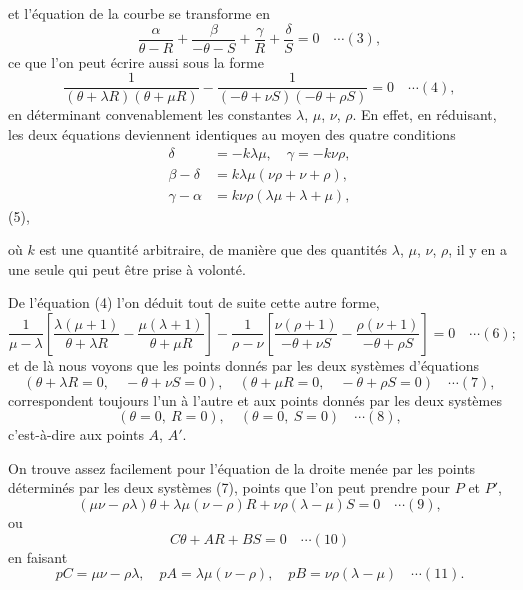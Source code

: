 \documentclass[12pt,a4paper]{article}
\begin{document}
et l'\'equation de la courbe se transforme en
\[
\frac{\alpha}{\theta - R} + \frac{\beta}{-\theta - S} + \frac{\gamma}{R} + \frac{\delta}{S} = 0 \quad\cdots(3),
\]
ce que l'on peut \'ecrire aussi sous la forme
\[
\frac{1}{(\theta + \lambda R)(\theta + \mu R)} - \frac{1}{(-\theta + \nu S)(-\theta + \rho S)} = 0 \quad\cdots(4),
\]
en d\'eterminant convenablement les constantes $\lambda$, $\mu$, $\nu$, $\rho$. En effet, en r\'eduisant, les deux \'equations deviennent identiques au moyen des quatre conditions
\begin{align*}
\delta &= -k\lambda\mu,\quad \gamma = -k\nu\rho,\\
\beta - \delta &= k\lambda\mu(\nu\rho + \nu + \rho),\\
\gamma - \alpha &= k\nu\rho(\lambda\mu + \lambda + \mu),
\end{align*}
\hfill (5),

\noindent o\`u $k$ est une quantit\'e arbitraire, de mani\`ere que des quantit\'es $\lambda$, $\mu$, $\nu$, $\rho$, il y en a une seule qui peut \^etre prise \`a volont\'e.

De l'\'equation (4) l'on d\'eduit tout de suite cette autre forme,
\[
\frac{1}{\mu - \lambda}\left[\frac{\lambda(\mu + 1)}{\theta + \lambda R} - \frac{\mu(\lambda + 1)}{\theta + \mu R}\right] - \frac{1}{\rho - \nu}\left[\frac{\nu(\rho + 1)}{-\theta + \nu S} - \frac{\rho(\nu + 1)}{-\theta + \rho S}\right] = 0 \quad\cdots(6);
\]
et de l\`a nous voyons que les points donn\'es par les deux syst\`emes d'\'equations
\[
(\theta + \lambda R = 0,\quad -\theta + \nu S = 0),\quad (\theta + \mu R = 0,\quad -\theta + \rho S = 0) \quad\cdots(7),
\]
correspondent toujours l'un \`a l'autre et aux points donn\'es par les deux syst\`emes
\[
(\theta = 0,\ R = 0),\quad (\theta = 0,\ S = 0) \quad\cdots(8),
\]
c'est-\`a-dire aux points $A$, $A'$.

On trouve assez facilement pour l'\'equation de la droite men\'ee par les points d\'etermin\'es par les deux syst\`emes (7), points que l'on peut prendre pour $P$ et $P'$,
\[
(\mu\nu - \rho\lambda)\theta + \lambda\mu(\nu - \rho)R + \nu\rho(\lambda - \mu)S = 0 \quad\cdots(9),
\]
ou
\[
C\theta + AR + BS = 0 \quad\cdots(10)
\]
en faisant
\[
pC = \mu\nu - \rho\lambda,\quad pA = \lambda\mu(\nu - \rho),\quad pB = \nu\rho(\lambda - \mu) \quad\cdots(11).
\]

\newpage
\setcounter{page}{189}
\end{document}
